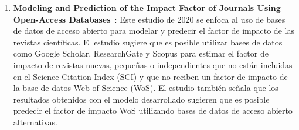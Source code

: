 \begin{enumerate}
  \item \textbf{Modeling and Prediction of the Impact Factor of Journals Using Open-Access Databases}~\cite{templ2020}: Este estudio de 2020 se enfoca al uso de bases de datos de acceso abierto para modelar y predecir el factor de impacto de las revistas científicas. El estudio sugiere que es posible utilizar bases de datos como Google Scholar, ResearchGate y Scopus para estimar el factor de impacto de revistas nuevas, pequeñas o independientes que no están incluidas en el Science Citation Index (SCI) y que no reciben un factor de impacto de la base de datos Web of Science (WoS). El estudio también señala que los resultados obtenidos con el modelo desarrollado sugieren que es posible predecir el factor de impacto WoS utilizando bases de datos de acceso abierto alternativas.
  
\end{enumerate}

